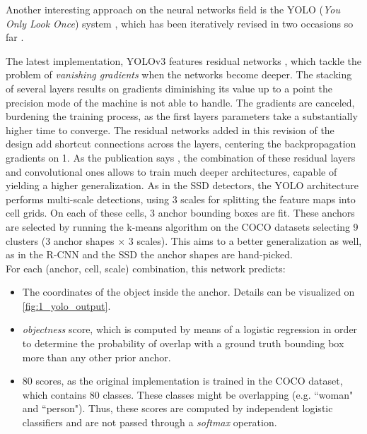 Another interesting approach on the neural networks field is the YOLO (\textit{You Only Look Once}) system \cite{yolov1}, which has been iteratively revised in two occasions so far \cite{yolov2} \cite{yolov3}.

The latest implementation, YOLOv3 \cite{yolov3} features residual networks \cite{resnets}, which tackle the problem of \textit{vanishing gradients} when the networks become deeper. The stacking of several layers results on gradients diminishing its value up to a point the precision mode of the machine is not able to handle. The gradients are canceled, burdening the training process, as the first layers parameters take a substantially higher time to converge. The residual networks added in this revision of the design add shortcut connections across the layers, centering the backpropagation gradients on 1. As the publication says \cite{yolov3}, the combination of these residual layers and convolutional ones allows to train much deeper architectures, capable of yielding a higher generalization. As in the SSD detectors, the YOLO architecture performs multi-scale detections, using 3 scales for splitting the feature maps into cell grids. On each of these cells, 3 anchor bounding boxes are fit. These anchors are selected by running the k-means algorithm on the COCO datasets selecting 9 clusters (3 anchor shapes $\times$ 3 scales). This aims to a better generalization as well, as in the R-CNN \cite{rcnn} and the SSD \cite{ssd} the anchor shapes are hand-picked.\\

For each (anchor, cell, scale) combination, this network predicts:

\begin{itemize}
	\item The coordinates of the object inside the anchor. Details can be visualized on \autoref{fig:1_yolo_output}.
	
	\item \textit{objectness} score, which is computed by means of a logistic regression in order to determine the probability of overlap with a ground truth bounding box more than any other prior anchor.
	
	\item 80 scores, as the original implementation is trained in the COCO dataset, which contains 80 classes. These classes might be overlapping (e.g. ``woman" and ``person"). Thus, these scores are computed by independent logistic classifiers and are not passed through a \textit{softmax} operation.
\end{itemize}



